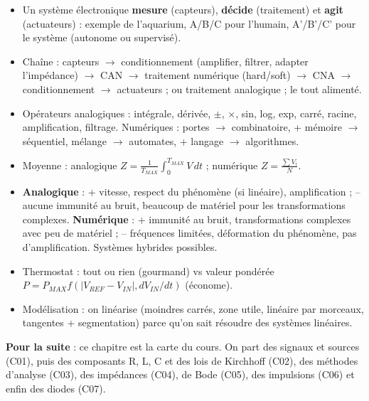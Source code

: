 
\begin{recapbox}[title={Récap pour l'examen --- C00 : Introduction}]
\begin{itemize}
  \item Un système électronique \textbf{mesure} (capteurs), \textbf{décide} (traitement) et
        \textbf{agit} (actuateurs) : exemple de l'aquarium, A/B/C pour l'humain, A'/B'/C'
        pour le système (autonome ou supervisé).
  \item Chaîne : capteurs $\to$ conditionnement (amplifier, filtrer, adapter l'impédance)
        $\to$ CAN $\to$ traitement numérique (hard/soft) $\to$ CNA $\to$ conditionnement
        $\to$ actuateurs ; ou traitement analogique ; le tout alimenté.
  \item Opérateurs analogiques : intégrale, dérivée, $\pm$, $\times$, sin, log, exp, carré,
        racine, amplification, filtrage. Numériques : portes $\to$ combinatoire, + mémoire
        $\to$ séquentiel, mélange $\to$ automates, + langage $\to$ algorithmes.
  \item Moyenne : analogique $Z = \frac{1}{T_{MAX}}\int_0^{T_{MAX}}V\,dt$ ; numérique
        $Z = \frac{\sum V_i}{N}$.
  \item \textbf{Analogique} : + vitesse, respect du phénomène (si linéaire), amplification ;
        -- aucune immunité au bruit, beaucoup de matériel pour les transformations complexes.
        \textbf{Numérique} : + immunité au bruit, transformations complexes avec peu de
        matériel ; -- fréquences limitées, déformation du phénomène, pas d'amplification.
        Systèmes hybrides possibles.
  \item Thermostat : tout ou rien (gourmand) vs valeur pondérée
        $P = P_{MAX} f(|V_{REF}-V_{IN}|, dV_{IN}/dt)$ (économe).
  \item Modélisation : on linéarise (moindres carrés, zone utile, linéaire par morceaux,
        tangentes + segmentation) parce qu'on sait résoudre des systèmes linéaires.
\end{itemize}
\textbf{Pour la suite} : ce chapitre est la carte du cours. On part des signaux et sources
(C01), puis des composants R, L, C et des lois de Kirchhoff (C02), des méthodes d'analyse
(C03), des impédances (C04), de Bode (C05), des impulsions (C06) et enfin des diodes (C07).
\end{recapbox}
